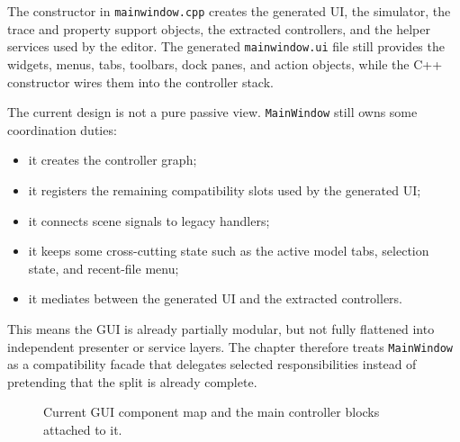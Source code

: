 The constructor in \texttt{mainwindow.cpp} creates the generated UI, the simulator, the trace and property support objects, the extracted controllers, and the helper services used by the editor. The generated \texttt{mainwindow.ui} file still provides the widgets, menus, tabs, toolbars, dock panes, and action objects, while the C++ constructor wires them into the controller stack.

The current design is not a pure passive view. \texttt{MainWindow} still owns some coordination duties:
\begin{itemize}
\item it creates the controller graph;
\item it registers the remaining compatibility slots used by the generated UI;
\item it connects scene signals to legacy handlers;
\item it keeps some cross-cutting state such as the active model tabs, selection state, and recent-file menu;
\item it mediates between the generated UI and the extracted controllers.
\end{itemize}

This means the GUI is already partially modular, but not fully flattened into independent presenter or service layers. The chapter therefore treats \texttt{MainWindow} as a compatibility facade that delegates selected responsibilities instead of pretending that the split is already complete.

\begin{figure}[htbp]
\centering
\caption{Current GUI component map and the main controller blocks attached to it.}
\label{fig:gui-architecture-component-map}
\end{figure}

